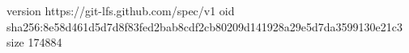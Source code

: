 version https://git-lfs.github.com/spec/v1
oid sha256:8e58d461d5d7d8f83fed2bab8cdf2cb80209d141928a29e5d7da3599130e21c3
size 174884
